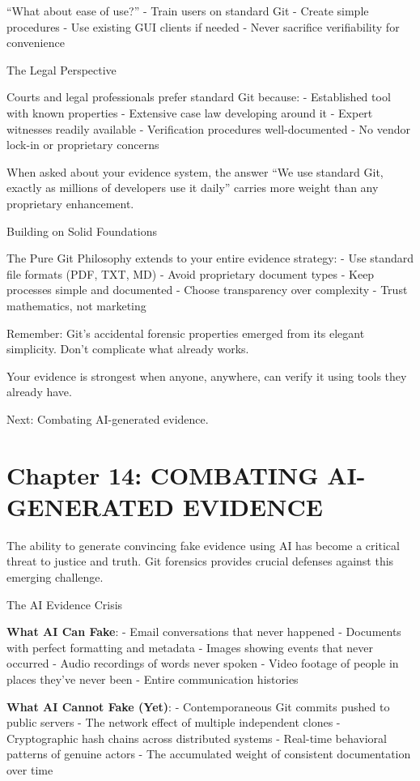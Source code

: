 ``What about ease of use?'' - Train users on standard Git - Create
simple procedures - Use existing GUI clients if needed - Never sacrifice
verifiability for convenience

The Legal Perspective

Courts and legal professionals prefer standard Git because: -
Established tool with known properties - Extensive case law developing
around it - Expert witnesses readily available - Verification procedures
well-documented - No vendor lock-in or proprietary concerns

When asked about your evidence system, the answer ``We use standard Git,
exactly as millions of developers use it daily'' carries more weight
than any proprietary enhancement.

Building on Solid Foundations

The Pure Git Philosophy extends to your entire evidence strategy: - Use
standard file formats (PDF, TXT, MD) - Avoid proprietary document types
- Keep processes simple and documented - Choose transparency over
complexity - Trust mathematics, not marketing

Remember: Git's accidental forensic properties emerged from its elegant
simplicity. Don't complicate what already works.

Your evidence is strongest when anyone, anywhere, can verify it using
tools they already have.

Next: Combating AI-generated evidence.

\section{Chapter 14: COMBATING AI-GENERATED
EVIDENCE}\label{chapter-14-combating-ai-generated-evidence}

The ability to generate convincing fake evidence using AI has become a
critical threat to justice and truth. Git forensics provides crucial
defenses against this emerging challenge.

The AI Evidence Crisis

\textbf{What AI Can Fake}: - Email conversations that never happened -
Documents with perfect formatting and metadata - Images showing events
that never occurred - Audio recordings of words never spoken - Video
footage of people in places they've never been - Entire communication
histories

\textbf{What AI Cannot Fake (Yet)}: - Contemporaneous Git commits pushed
to public servers - The network effect of multiple independent clones -
Cryptographic hash chains across distributed systems - Real-time
behavioral patterns of genuine actors - The accumulated weight of
consistent documentation over time

